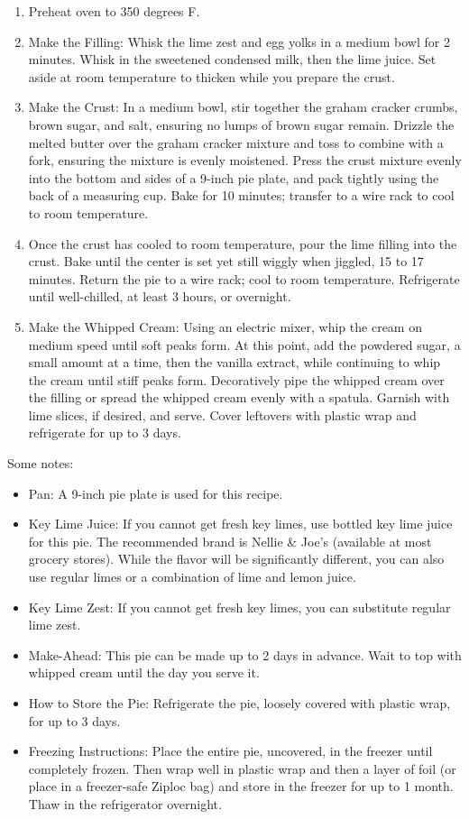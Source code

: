 \instructions
\begin{enumerate}
    \item Preheat oven to 350 degrees F.
    \item Make the Filling: Whisk the lime zest and egg yolks in a medium bowl
    for 2 minutes. Whisk in the sweetened condensed milk, then the lime juice.
    Set aside at room temperature to thicken while you prepare the crust.
    \item Make the Crust: In a medium bowl, stir together the graham cracker
    crumbs, brown sugar, and salt, ensuring no lumps of brown sugar remain.
    Drizzle the melted butter over the graham cracker mixture and toss to
    combine with a fork, ensuring the mixture is evenly moistened. Press the
    crust mixture evenly into the bottom and sides of a 9-inch pie plate, and
    pack tightly using the back of a measuring cup. Bake for 10 minutes;
    transfer to a wire rack to cool to room temperature.
    \item Once the crust has cooled to room temperature, pour the lime filling
    into the crust. Bake until the center is set yet still wiggly when jiggled,
    15 to 17 minutes. Return the pie to a wire rack; cool to room temperature.
    Refrigerate until well-chilled, at least 3 hours, or overnight.
    \item Make the Whipped Cream: Using an electric mixer, whip the cream on
    medium speed until soft peaks form. At this point, add the powdered sugar, a
    small amount at a time, then the vanilla extract, while continuing to whip
    the cream until stiff peaks form. Decoratively pipe the whipped cream over
    the filling or spread the whipped cream evenly with a spatula. Garnish with
    lime slices, if desired, and serve. Cover leftovers with plastic wrap and
    refrigerate for up to 3 days.
\end{enumerate}

Some notes:
\begin{itemize}
    \item Pan: A 9-inch pie plate is used for this recipe.
    \item Key Lime Juice: If you cannot get fresh key limes, use bottled key
    lime juice for this pie. The recommended brand is Nellie \& Joe's (available
    at most grocery stores). While the flavor will be significantly different,
    you can also use regular limes or a combination of lime and lemon juice.
    \item Key Lime Zest: If you cannot get fresh key limes, you can substitute
    regular lime zest.
    \item Make-Ahead: This pie can be made up to 2 days in advance. Wait to
    top with whipped cream until the day you serve it.
    \item How to Store the Pie: Refrigerate the pie, loosely covered with
    plastic wrap, for up to 3 days.
    \item Freezing Instructions: Place the entire pie, uncovered, in the freezer
    until completely frozen. Then wrap well in plastic wrap and then a layer of
    foil (or place in a freezer-safe Ziploc bag) and store in the freezer for up
    to 1 month. Thaw in the refrigerator overnight.

\end{itemize}
